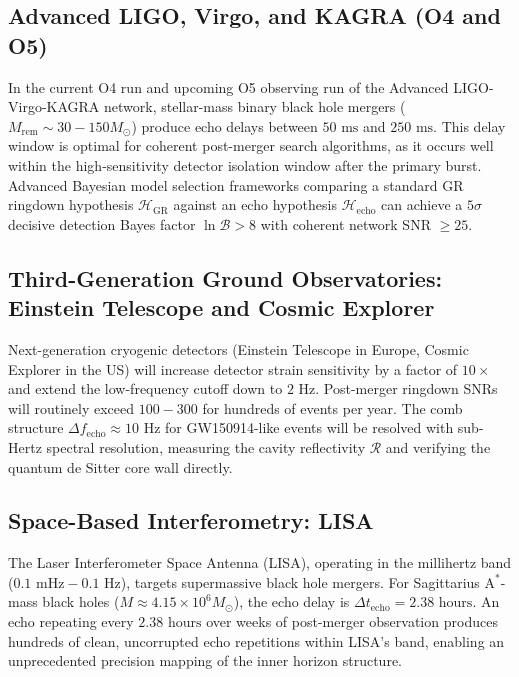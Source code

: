 \documentclass[11pt,a4paper]{article}
\begin{document}
\subsection{Advanced LIGO, Virgo, and KAGRA (O4 and O5)}
In the current O4 run and upcoming O5 observing run of the Advanced LIGO-Virgo-KAGRA network, stellar-mass binary black hole mergers ($M_{\mathrm{rem}} \sim 30 - 150 M_\odot$) produce echo delays between $50\text{ ms}$ and $250\text{ ms}$. This delay window is optimal for coherent post-merger search algorithms, as it occurs well within the high-sensitivity detector isolation window after the primary burst. Advanced Bayesian model selection frameworks comparing a standard GR ringdown hypothesis $\mathcal{H}_{\mathrm{GR}}$ against an echo hypothesis $\mathcal{H}_{\mathrm{echo}}$ can achieve a $5\sigma$ decisive detection Bayes factor $\ln \mathcal{B} > 8$ with coherent network SNR $\ge 25$.

\subsection{Third-Generation Ground Observatories: Einstein Telescope and Cosmic Explorer}
Next-generation cryogenic detectors (Einstein Telescope in Europe, Cosmic Explorer in the US) will increase detector strain sensitivity by a factor of $10\times$ and extend the low-frequency cutoff down to $2\text{ Hz}$. Post-merger ringdown SNRs will routinely exceed $100 - 300$ for hundreds of events per year. The comb structure $\Delta f_{\mathrm{echo}} \approx 10\text{ Hz}$ for GW150914-like events will be resolved with sub-Hertz spectral resolution, measuring the cavity reflectivity $\mathcal{R}$ and verifying the quantum de Sitter core wall directly.

\subsection{Space-Based Interferometry: LISA}
The Laser Interferometer Space Antenna (LISA), operating in the millihertz band ($0.1\text{ mHz} - 0.1\text{ Hz}$), targets supermassive black hole mergers. For Sagittarius $\text{A}^*$-mass black holes ($M \approx 4.15 \times 10^6 M_\odot$), the echo delay is $\Delta t_{\mathrm{echo}} = 2.38\text{ hours}$. An echo repeating every $2.38\text{ hours}$ over weeks of post-merger observation produces hundreds of clean, uncorrupted echo repetitions within LISA's band, enabling an unprecedented precision mapping of the inner horizon structure.
\end{document}
